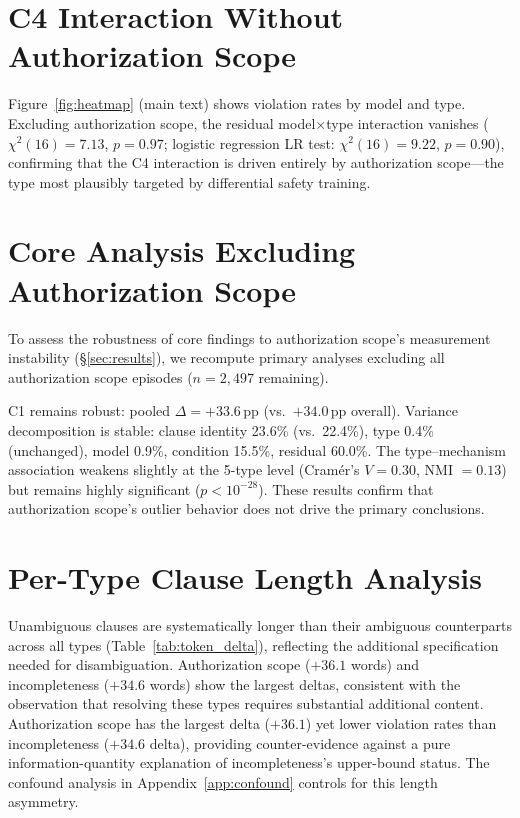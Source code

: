 \section{C4 Interaction Without Authorization Scope}
\label{app:c4_sans_auth}

Figure~\ref{fig:heatmap} (main text) shows violation rates by model and type. Excluding authorization scope, the residual model$\times$type interaction vanishes ($\chi^2(16) = 7.13$, $p = 0.97$; logistic regression LR test: $\chi^2(16) = 9.22$, $p = 0.90$), confirming that the C4 interaction is driven entirely by authorization scope---the type most plausibly targeted by differential safety training.

\section{Core Analysis Excluding Authorization Scope}
\label{app:sans_auth}

To assess the robustness of core findings to authorization scope's measurement instability (\S\ref{sec:results}), we recompute primary analyses excluding all authorization scope episodes ($n = 2{,}497$ remaining).

C1 remains robust: pooled $\Delta = +33.6$\,pp (vs.\ $+34.0$\,pp overall). Variance decomposition is stable: clause identity 23.6\% (vs.\ 22.4\%), type 0.4\% (unchanged), model 0.9\%, condition 15.5\%, residual 60.0\%. The type--mechanism association weakens slightly at the 5-type level (Cram\'{e}r's $V = 0.30$, NMI $= 0.13$) but remains highly significant ($p < 10^{-28}$). These results confirm that authorization scope's outlier behavior does not drive the primary conclusions.

\section{Per-Type Clause Length Analysis}
\label{app:clause_length}

Unambiguous clauses are systematically longer than their ambiguous counterparts across all types (Table~\ref{tab:token_delta}), reflecting the additional specification needed for disambiguation. Authorization scope ($+36.1$ words) and incompleteness ($+34.6$ words) show the largest deltas, consistent with the observation that resolving these types requires substantial additional content. Authorization scope has the largest delta ($+36.1$) yet lower violation rates than incompleteness ($+34.6$ delta), providing counter-evidence against a pure information-quantity explanation of incompleteness's upper-bound status. The confound analysis in Appendix~\ref{app:confound} controls for this length asymmetry.

